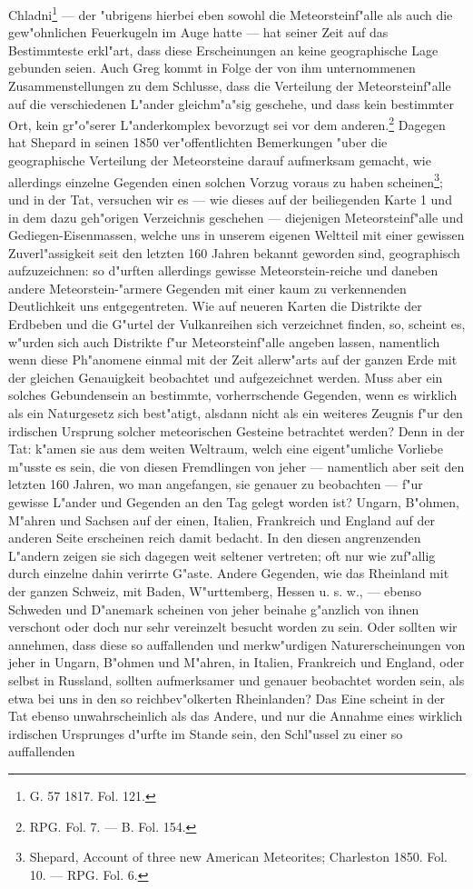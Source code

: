 \documentclass[a4paper, 8pt, oneside, polutonikogreek, german]{article}
\begin{document}
Chladni\footnote{G. 57 1817. Fol. 121.} --- der "ubrigens hierbei eben sowohl die Meteorsteinf"alle als auch die gew"ohnlichen Feuerkugeln im Auge hatte --- hat seiner Zeit auf das Bestimmteste erkl"art, dass diese Erscheinungen an keine geographische Lage gebunden seien. Auch Greg kommt in Folge der von ihm unternommenen Zusammenstellungen zu dem Schlusse, dass die Verteilung der Meteorsteinf"alle auf die verschiedenen L"ander gleichm"a"sig geschehe, und dass kein bestimmter Ort, kein gr"o"serer L"anderkomplex bevorzugt sei vor dem anderen.\footnote{RPG. Fol. 7. — B. Fol. 154.} Dagegen hat Shepard in seinen 1850 ver"offentlichten Bemerkungen "uber die geographische Verteilung der Meteorsteine darauf aufmerksam gemacht, wie allerdings einzelne Gegenden einen solchen Vorzug voraus zu haben scheinen\footnote{Shepard, Account of three new American Meteorites; Charleston 1850. Fol. 10. — RPG. Fol. 6.}; und in der Tat, versuchen wir es --- wie dieses auf der beiliegenden Karte 1 und in dem dazu geh"origen Verzeichnis geschehen --- diejenigen Meteorsteinf"alle und Gediegen-Eisenmassen, welche uns in unserem eigenen Weltteil mit einer gewissen Zuverl"assigkeit seit den letzten 160 Jahren bekannt geworden sind, geographisch aufzuzeichnen: so d"urften allerdings gewisse Meteorstein-reiche und daneben andere Meteorstein-"armere Gegenden mit einer kaum zu verkennenden Deutlichkeit uns entgegentreten. Wie auf neueren Karten die Distrikte der Erdbeben und die G"urtel der Vulkanreihen sich verzeichnet finden, so, scheint es, w"urden sich auch Distrikte f"ur Meteorsteinf"alle angeben lassen, namentlich wenn diese Ph"anomene einmal mit der Zeit allerw"arts auf der ganzen Erde mit der gleichen Genauigkeit beobachtet und aufgezeichnet werden. Muss aber ein solches Gebundensein an bestimmte, vorherrschende Gegenden, wenn es wirklich als ein Naturgesetz sich best"atigt, alsdann nicht als ein weiteres Zeugnis f"ur den irdischen Ursprung solcher meteorischen Gesteine betrachtet werden? Denn in der Tat: k"amen sie aus dem weiten Weltraum, welch eine eigent"umliche Vorliebe m"usste es sein, die von diesen Fremdlingen von jeher --- namentlich aber seit den letzten 160 Jahren, wo man angefangen, sie genauer zu beobachten --- f"ur gewisse L"ander und Gegenden an den Tag gelegt worden ist? Ungarn, B"ohmen, M"ahren und Sachsen auf der einen, Italien, Frankreich und England auf der anderen Seite erscheinen reich damit bedacht. In den diesen angrenzenden L"andern zeigen sie sich dagegen weit seltener vertreten; oft nur wie zuf"allig durch einzelne dahin verirrte G"aste. Andere Gegenden, wie das Rheinland mit der ganzen Schweiz, mit Baden, W"urttemberg, Hessen u. s. w., --- ebenso Schweden und D"anemark scheinen von jeher beinahe g"anzlich von ihnen verschont oder doch nur sehr vereinzelt besucht worden zu sein. Oder sollten wir annehmen, dass diese so auffallenden und merkw"urdigen Naturerscheinungen von jeher in Ungarn, B"ohmen und M"ahren, in Italien, Frankreich und England, oder selbst in Russland, sollten aufmerksamer und genauer beobachtet worden sein, als etwa bei uns in den so reichbev"olkerten Rheinlanden? Das Eine scheint in der Tat ebenso unwahrscheinlich als das Andere, und nur die Annahme eines wirklich irdischen Ursprunges d"urfte im Stande sein, den Schl"ussel zu einer so auffallenden 
\end{document}

